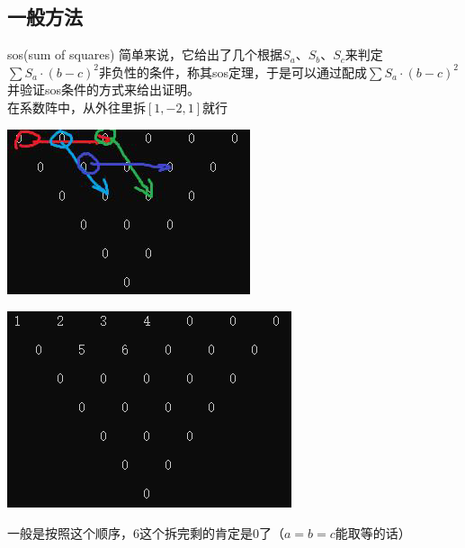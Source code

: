 \documentclass[UTF8]{ctexart}
\begin{document}
\subsection{一般方法}
sos(sum of squares)
简单来说，它给出了几个根据$ S_{a} $、$ S_{b} $、$ S_{c} $来判定$ \displaystyle \sum S_{a}·(b-c)^{2} $非负性的条件，称其sos定理，于是可以通过配成$ \displaystyle \sum S_{a}·(b-c)^{2} $并验证sos条件的方式来给出证明。\\
在系数阵中，从外往里拆$ [1,-2,1] $就行
\begin{center}
	\includegraphics[width=0.4\linewidth]{37}
\end{center}
\begin{center}
	\includegraphics[width=0.4\linewidth]{45}
\end{center}
一般是按照这个顺序，$ 6 $这个拆完剩的肯定是$ 0 $了（$ a=b=c $能取等的话）
\end{document}
